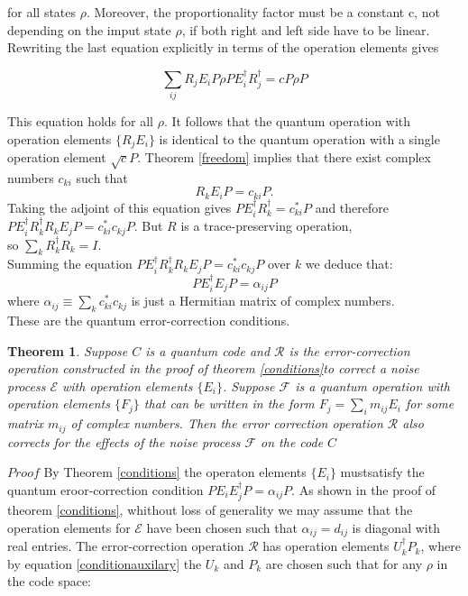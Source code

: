 \documentclass{article}
\newtheorem{theorem}{Theorem}
\begin{document}
for all states $\rho$. Moreover, the proportionality factor must be a constant c, not
depending on the imput state $\rho$, if both right and left side have to be linear.
Rewriting the last equation explicitly in terms of the operation elements gives

\begin{equation}
	\sum_{ij} R_j E_i P \rho P E_i^\dagger R_j^\dagger = cP \rho P
\end{equation}

This equation holds for all $\rho$. It follows that the quantum operation with operation
elements $\{R_jE_i\}$ is identical to the quantum operation with a single operation element
$\sqrt{c}P$. Theorem \ref{freedom} implies that there exist complex numbers
$c_{ki}$ such that
\begin{equation}
	R_k E_i P = c_{ki} P.
\end{equation}
Taking the adjoint of this equation gives $P E_i^\dagger R_k^\dagger = c_{ki}^* P$ and therefore\\
$P E_i^\dagger R_k^\dagger R_k E_j P =
	c_{ki}^* c_{kj} P$.
But $R$ is a trace-preserving operation,\\
so $\sum_k R_k^\dagger R_k = I$. \\ Summing the equation $P E_i^\dagger R_k^\dagger R_k E_j P = c_{ki}^* c_{kj} P$
over $k$ we deduce that:
\begin{equation}
	P E_i^\dagger E_j P = \alpha_{ij} P
\end{equation}
where $\alpha_{ij} \equiv \sum_k c_{ki}^* c_{kj}$ is just a Hermitian matrix of complex numbers.\\
These are the quantum error-correction conditions.


\begin{theorem}
	Suppose $C$ is a quantum code and $\mathcal{R}$ is the error-correction operation
	constructed in the proof of theorem \ref{conditions}to correct a
	noise process $\mathcal{E}$ with operation elements $\{E_i\}$.
	Suppose $\mathcal{F}$ is a quantum operation with operation elements $\{F_j\}$
	that can be written in the form $F_j = \sum_i m_{ij} E_i$ for some matrix $m_{ij}$
	of complex numbers.
	Then the error correction operation $\mathcal{R}$ also corrects for the effects
	of the noise process $\mathcal{F}$ on the code $C$
\end{theorem}

$Proof$
By Theorem \ref{conditions} the operaton elements
$\{E_i\}$ mustsatisfy the quantum eroor-correction condition $PE_iE_j^\dag P = \alpha_{ij}P$.
As shown in the proof of theorem \ref{conditions},
whithout loss of generality we may assume that the operation elements for $\mathcal{E}$
have been chosen such that $\alpha_{ij} = d_{ij}$ is diagonal with real entries.
The error-correction operation $\mathcal{R}$ has operation elements $U_k^\dagger P_k$, where by equation
\ref{conditionauxilary} the $U_k$ and $P_k$ are chosen such that for any $\rho$ in
the code space:
\end{document}
